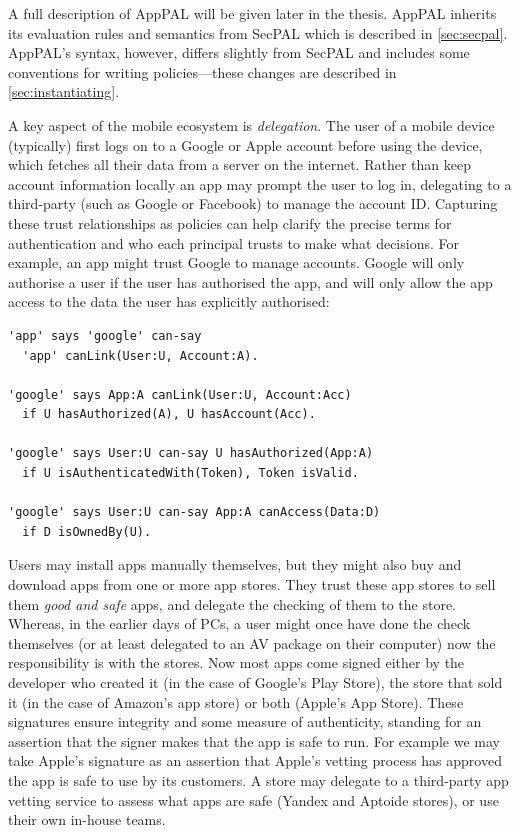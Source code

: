 \documentclass[thesis.tex]{subfiles}
\begin{document}
A full description of AppPAL will be given later in the thesis.  
AppPAL inherits its evaluation rules and semantics from SecPAL which is described in
\autoref{sec:secpal}.  AppPAL's syntax, however, differs slightly
from SecPAL and includes some conventions for writing policies---these changes
are described in \autoref{sec:instantiating}.

A key aspect of the mobile ecosystem is \emph{delegation}. The user of a mobile
device (typically) first logs on to a Google or Apple account before using the
device, which fetches all their data from a server on the internet. Rather than
keep account information locally an app may prompt the user to log in,
delegating to a third-party (such as Google or Facebook) to manage the account
ID. Capturing these trust relationships as policies can help clarify the precise
terms for authentication and who each principal trusts to make what decisions.
For example, an app might trust Google to manage accounts. Google will only
authorise a user if the user has authorised the app, and will only allow the app
access to the data the user has explicitly authorised:

\begin{lstlisting}
'app' says 'google' can-say 
  'app' canLink(User:U, Account:A).

'google' says App:A canLink(User:U, Account:Acc)
  if U hasAuthorized(A), U hasAccount(Acc).

'google' says User:U can-say U hasAuthorized(App:A)
  if U isAuthenticatedWith(Token), Token isValid.

'google' says User:U can-say App:A canAccess(Data:D)
  if D isOwnedBy(U).
\end{lstlisting}

Users may install apps manually themselves, but they might also buy and download
apps from one or more app stores. They trust these app stores to sell them
\emph{good and safe} apps, and delegate the checking of them to the store.
Whereas, in the earlier days of PCs, a user might once have done the check
themselves (or at least delegated to an \ac{AV} package on their computer) now
the responsibility is with the stores. Now most apps come signed either by the
developer who created it (in the case of Google's Play Store), the store that
sold it (in the case of Amazon's app store) or both (Apple's App Store). These
signatures ensure integrity and some measure of authenticity, standing for an
assertion that the signer makes that the app is safe to run. For example we may
take Apple's signature as an assertion that Apple's vetting process has approved
the app is safe to use by its customers. A store may delegate to a third-party
app vetting service to assess what apps are safe (Yandex and Aptoide stores), or
use their own in-house teams.
\end{document}
